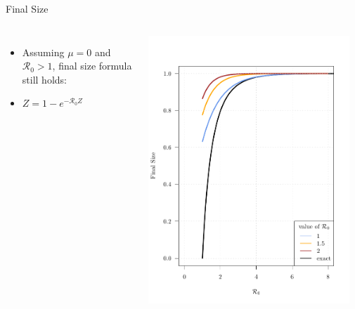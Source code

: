 \documentclass{beamer}\usepackage[]{graphicx}\usepackage[]{color}
\begin{document}
\begin{frame}{Final Size}
\begin{columns}[onlytextwidth]
\begin{itemize}
\setlength\itemsep{2em}
\item Assuming $\mu =0$ and $\mathcal R_0 > 1$, final size formula still holds:
\item $Z = 1 - e^{-\mathcal R_0 Z}$
\end{itemize}
\includegraphics[width=0.95\textwidth]{images/finalsize.pdf}
\end{columns}
\end{frame}
\end{document}
